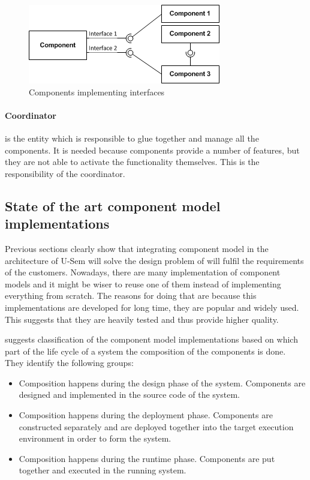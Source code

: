 	\begin{figure}[h!]
  		\centering
  		\includegraphics[scale=0.75]{plug-in/component-services.png}
  		\caption{Components implementing interfaces }
  		\label{fig_comp}
	\end{figure}

\paragraph{Coordinator}
	is the entity which is responsible to glue together and manage all the components. It is needed because components provide a number of features, but they are not able to activate the functionality themselves. This is the responsibility of the coordinator.

\subsection{State of the art component model implementations}

Previous sections clearly show that integrating component model in the architecture of U-Sem will solve the design problem of will fulfil the requirements of the customers. Nowadays, there are many implementation of component models and it might be wiser to reuse one of them instead of implementing everything from scratch. The reasons for doing that are because this implementations are developed for long time, they are popular and widely used. This suggests that they are heavily tested and thus provide higher quality. 

\cite{Lau} suggests classification of the component model implementations based on which part of the life cycle of a system the composition of the components is done. They identify the following groups:

\begin{itemize}
	\item  Composition happens during the design phase of the system. Components are designed and implemented in the source code of the system.
	\item  Composition happens during the deployment phase. Components are constructed separately and are deployed together into the target execution environment in order to form the system.
	\item Composition happens during the runtime phase. Components are put together and executed in the running system.
\end{itemize}

